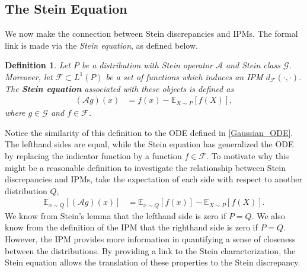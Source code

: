\documentclass[12pt]{article}
\newcommand{\E}{\mathbb{E}}
\newcommand{\functionSpace}{\mathcal{F}} %
\newcommand{\IPMClass}{\mathcal{F}} %
\newcommand{\steinClass}{\mathcal{G}}
\newcommand{\fIPM}{f} %
\newcommand{\fStein}{g} %
\newcommand{\steinOperator}{\mathcal{A}}
\newcommand{\dist}{P}
\newcommand{\distApprox}{Q}
\newcommand{\metric}{d}
\newtheorem{definition}{Definition}
\begin{document}
\begin{enumerate}
\subsection{The Stein Equation}
We now make the connection between Stein discrepancies and IPMs. The formal link is made via the \textit{Stein equation}, as defined below. 
\begin{definition}
Let $\dist$ be a distribution with Stein operator $\steinOperator$ and Stein class $\steinClass$. Moreover, let $\functionSpace \subset L^1(\dist)$ be a set of functions 
which induces an IPM $\metric_{\functionSpace}(\cdot, \cdot)$. The \textbf{Stein equation} associated with these objects is defined as 
\begin{align}
(\steinOperator \fStein)(x) &= \fIPM(x) - \E_{X \sim \dist}\left[\fIPM(X) \right],
\end{align}
where $\fStein \in \steinClass$ and $\fIPM \in \functionSpace$. 
\end{definition}
Notice the similarity of this definition to the ODE defined in \ref{Gaussian_ODE}. The lefthand sides are equal, while the Stein equation has generalized the ODE by replacing 
the indicator function by a function $\fIPM \in \IPMClass$. To motivate why this might be a reasonable definition to investigate the relationship between Stein discrepancies and 
IPMs, take the expectation of each side with respect to another distribution $\distApprox$,
\begin{align*}
\E_{x \sim \distApprox}\left[(\steinOperator \fStein)(x) \right] &= \E_{x \sim \distApprox}\left[\fIPM(x) \right] - \E_{X \sim \dist}\left[\fIPM(X) \right]. 
\end{align*}
We know from Stein's lemma that the lefthand side is zero if $\dist = \distApprox$. We also know from the definition of the IPM that the righthand side is zero if $P = Q$. 
However, the IPM provides more information in quantifying a sense of closeness between the distributions. By providing a link to the Stein characterization, the Stein equation 
allows the translation of these properties to the Stein discrepancy.  

\end{enumerate}
\end{document}
